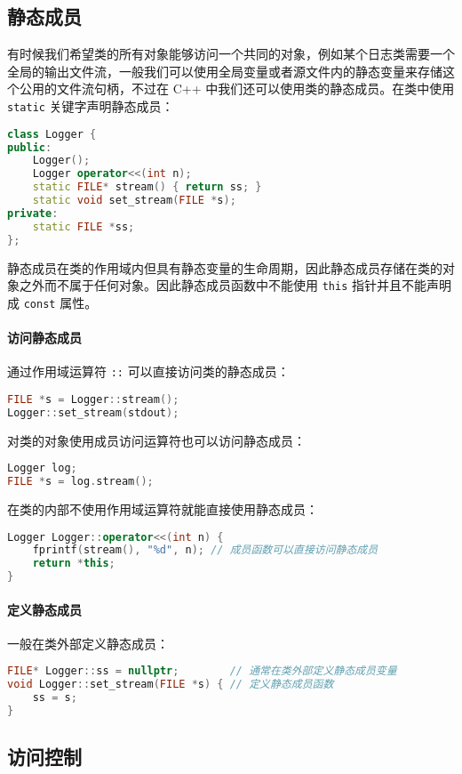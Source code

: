 \documentclass[hyperref,UTF8]{article}
\begin{document}
\subsection{静态成员}

有时候我们希望类的所有对象能够访问一个共同的对象，例如某个日志类需要一个全局的输出文件流，一般我们可以使用全局变量或者源文件内的静态变量来存储这个公用的文件流句柄，不过在 C++ 中我们还可以使用类的静态成员。在类中使用 \texttt{static} 关键字声明静态成员：
\begin{lstlisting}[language=c++]
class Logger {
public:
    Logger();
    Logger operator<<(int n);
    static FILE* stream() { return ss; }
    static void set_stream(FILE *s);
private:
    static FILE *ss;
};
\end{lstlisting}
静态成员在类的作用域内但具有静态变量的生命周期，因此静态成员存储在类的对象之外而不属于任何对象。因此静态成员函数中不能使用 \texttt{this} 指针并且不能声明成 \texttt{const} 属性。

\paragraph{访问静态成员}

通过作用域运算符 \texttt{::} 可以直接访问类的静态成员：
\begin{lstlisting}[language=c++]
FILE *s = Logger::stream();
Logger::set_stream(stdout);
\end{lstlisting}
对类的对象使用成员访问运算符也可以访问静态成员：
\begin{lstlisting}[language=c++]
Logger log;
FILE *s = log.stream();
\end{lstlisting}
在类的内部不使用作用域运算符就能直接使用静态成员：
\begin{lstlisting}[language=c++]
Logger Logger::operator<<(int n) {
    fprintf(stream(), "%d", n); // 成员函数可以直接访问静态成员
    return *this;
}
\end{lstlisting}

\paragraph{定义静态成员}

一般在类外部定义静态成员：
\begin{lstlisting}[language=c++]
FILE* Logger::ss = nullptr;        // 通常在类外部定义静态成员变量
void Logger::set_stream(FILE *s) { // 定义静态成员函数
    ss = s;
}
\end{lstlisting}

\subsection{访问控制}
\end{document}

